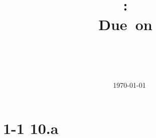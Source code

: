 \documentclass[12pt,a4paper]{article}
\title{
	\vspace{2in}
	\textmd{\textbf{\hwClass:\ \hwTitle}}\\
	\normalsize\vspace{0.1in}\small{Due\ on\ \hwDueDate}\\
	\vspace{0.1in}\large{\textit{\hwClassInstructor\ \hwClassTime}}
	\vspace{3in}
}
\author{
	\textbf{\hwAuthorName}\\
	\small{\hwAuthorID}
}
\date{\today}
\newenvironment{problem}[1]{\section*{#1}}{}
\newenvironment{answer}{
	\vspace{0.2in}
}{
	\vspace{0.2in}
}
\begin{document}
\maketitle
\newpage

\begin{problem}{1-1 10.a}
	\lipsum[1]
	\begin{answer}
		\lipsum[1]
	\end{answer}
\end{problem}
\end{document}
